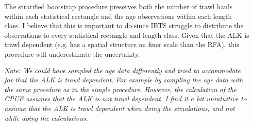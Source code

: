 \documentclass[a4paper 12pt]{article}
\numberwithin{equation}{section}
\begin{document}
The stratified bootstrap procedure preserves both the number of trawl hauls within each statistical rectangle and the age observations within each length class. I believe that this is important to do since IBTS struggle to distribute the observations to every statistical rectangle and length class. Given that the ALK is trawl dependent (e.g. has a spatial structure on finer scale than the RFA), this procedure will underestimate the uncertainty. 

\textit{Note: We could have sampled the age data differently and tried to accommodate for that the ALK is trawl dependent. For example by sampling the age data with the same procedure as in the simple procedure. However, the calculation of the CPUE assumes that the ALK is not trawl dependent. I find it a bit unintuitive to assume that the ALK is trawl dependent when doing the simulations, and not while doing the calculations.} 

%  
%  
  
\end{document}
